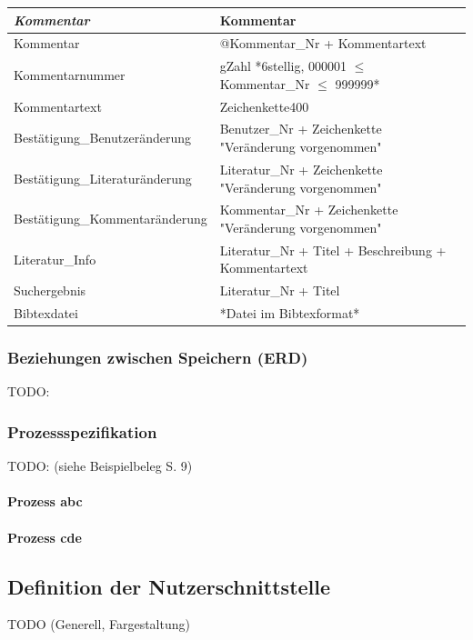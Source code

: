 \begin{tabular}[ht]{|l|l|}
\emph{Kommentar} & {Kommentar} \\
\hline
Kommentar & @Kommentar\_Nr + Kommentartext \\
\hline
Kommentarnummer & gZahl *6stellig, 000001 $\leq$ Kommentar\_Nr $\leq$ 999999* \\
\hline
Kommentartext & Zeichenkette400 \\
\hline\hline

Best\"atigung\_Benutzer\"anderung & Benutzer\_Nr + Zeichenkette "Ver\"anderung vorgenommen" \\
\hline
Best\"atigung\_Literatur\"anderung & Literatur\_Nr + Zeichenkette "Ver\"anderung vorgenommen" \\
\hline
Best\"atigung\_Kommentar\"anderung & Kommentar\_Nr + Zeichenkette "Ver\"anderung vorgenommen" \\
\hline
Literatur\_Info & Literatur\_Nr + Titel + Beschreibung + Kommentartext \\
\hline
Suchergebnis & Literatur\_Nr + Titel \\
\hline
Bibtexdatei & *Datei im Bibtexformat* \\
\hline

\end{tabular}

\subsubsection{Beziehungen zwischen Speichern (ERD)}
TODO:

\subsubsection{Prozessspezifikation}
TODO: (siehe Beispielbeleg S. 9)

\paragraph{Prozess abc}

\paragraph{Prozess cde}

\subsection{Definition der Nutzerschnittstelle}
TODO (Generell, Fargestaltung)

